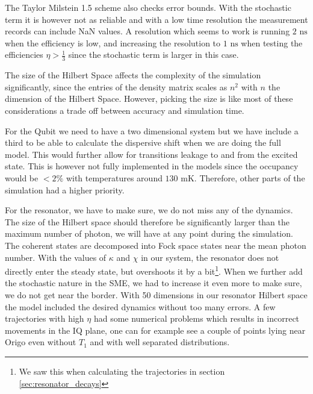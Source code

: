 The Taylor Milstein 1.5 scheme also checks error bounds. With the stochastic term it is however not as reliable and with a low time resolution the measurement records can include NaN values. A resolution which seems to work is running $2 \text{ ns}$ when the efficiency is low, and increasing the resolution to $1 \text{ ns}$ when testing the efficiencies $\eta > \frac13$ since the stochastic term is larger in this case.

The size of the Hilbert Space affects the complexity of the simulation significantly, since the entries of the density matrix scales as $n^2$ with $n$ the dimension of the Hilbert Space. However, picking the size is like most of these considerations a trade off between accuracy and simulation time. 

For the Qubit we need to have a two dimensional system but we have include a third to be able to calculate the dispersive shift when we are doing the full model. This would further allow for transitions leakage to and from the excited state. This is however not fully implemented in the models since the occupancy would be $<2\%$ with temperatures around $130$ mK. Therefore, other parts of the simulation had a higher priority.

For the resonator, we have to make sure, we do not miss any of the dynamics. The size of the Hilbert space should therefore be significantly larger than the maximum number of photon, we will have at any point during the simulation. The coherent states are decomposed into Fock space states near the mean photon number. With the values of $\kappa$ and $\chi$ in our system, the resonator does not directly enter the steady state, but overshoots it by a bit\footnote[][1 cm]{We saw this when calculating the trajectories in section \ref{sec:resonator_decays}}. When we further add the stochastic nature in the SME, we had to increase it even more to make sure, we do not get near the border. With 50 dimensions in our resonator Hilbert space the model included the desired dynamics without too many errors. A few trajectories with high $\eta$ had some numerical problems which results in incorrect movements in the IQ plane, one can for example see a couple of points lying near Origo even without $T_1$ and with well separated distributions. 

